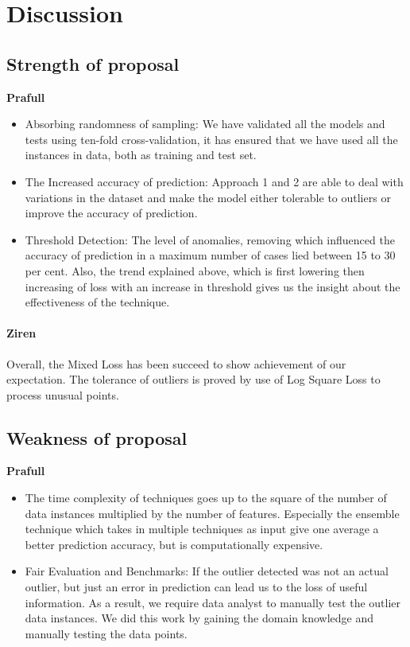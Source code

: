 \documentclass[runningheads]{llncs}
\begin{document}
\section{Discussion}
\subsection{Strength of proposal}
\textbf{Prafull}
\begin{itemize}
    \item Absorbing randomness of sampling: We have validated all the models and tests using ten-fold cross-validation, it has ensured that we have used all the instances in data, both as training and test set.
    \item The Increased accuracy of prediction:
    Approach 1 and 2 are able to deal with variations in the dataset and make the model either tolerable to outliers or improve the accuracy of prediction.
    \item Threshold Detection: The level of anomalies, removing which influenced the accuracy of prediction in a maximum number of cases lied between 15 to 30 per cent. Also, the trend explained above, which is first lowering then increasing of loss with an increase in threshold gives us the insight about the effectiveness of the technique.
\end{itemize}

\paragraph{Ziren}Overall, the Mixed Loss has been succeed to show achievement of our expectation. The tolerance of outliers is proved by use of Log Square Loss to process unusual points.

\subsection{Weakness of proposal}
\textbf{Prafull}
\begin{itemize}
    \item The time complexity of techniques goes up to the square of the number of data instances multiplied by the number of features. Especially the ensemble technique which takes in multiple techniques as input give one average a better prediction accuracy, but is computationally expensive.
    \item Fair Evaluation and Benchmarks: If the outlier detected was not an actual outlier, but just an error in prediction can lead us to the loss of useful information. As a result, we require data analyst to manually test the outlier data instances. We did this work by gaining the domain knowledge and manually testing the data points.
\end{itemize}
\end{document}
